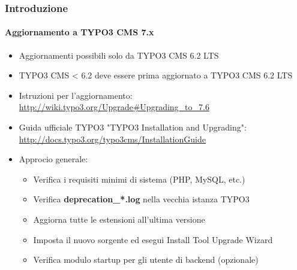 \begin{frame}[fragile]
	\frametitle{Introduzione}
	\framesubtitle{Aggiornamento a TYPO3 CMS 7.x}

	\begin{itemize}
		\item Aggiornamenti possibili solo da TYPO3 CMS 6.2 LTS
		\item TYPO3 CMS < 6.2 deve essere prima aggiornato a TYPO3 CMS 6.2 LTS
	\end{itemize}

	\begin{itemize}

		\item Istruzioni per l'aggiornamento:\newline
			\smaller\url{http://wiki.typo3.org/Upgrade#Upgrading_to_7.6}\normalsize
		\item Guida ufficiale TYPO3 "TYPO3 Installation and Upgrading":
			\smaller\url{http://docs.typo3.org/typo3cms/InstallationGuide}\normalsize
		\item Approcio generale:
			\begin{itemize}
				\item Verifica i requisiti minimi di sistema \small(PHP, MySQL, etc.)
				\item Verifica \textbf{deprecation\_*.log} nella vecchia istanza TYPO3
				\item Aggiorna tutte le estensioni all'ultima versione
				\item Imposta il nuovo sorgente ed esegui Install Tool \textrightarrow Upgrade Wizard
				\item Verifica modulo startup per gli utente di backend (opzionale)
			\end{itemize}
	\end{itemize}

\end{frame}

